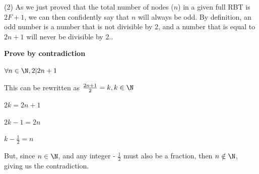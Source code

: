 \documentclass[]{article}
\newcommand\tab[1][0.62cm]{\hspace*{#1}}
\begin{document}
\tab (2) As we just proved that the total number of nodes ($n$) in a given full RBT is $2F+1$, we can then confidently say that $n$ will always be odd. By definition, an odd number is a number that is not divisible by 2, and a number that is equal to $2n+1$ will never be divisible by 2.. 

\textbf{Prove by contradiction}

$\forall n \in \N, 2 | 2n+1$

This can be rewritten as $\frac{2n+1}{2} = k, k \in \N$

$2k = 2n+1$

$2k-1 = 2n$

$k - \frac{1}{2} = n$

But, since $n \in \N$, and any integer - $\frac{1}{2}$ must also be a fraction, then $n \notin \N$, giving us the contradiction.
\end{document}
